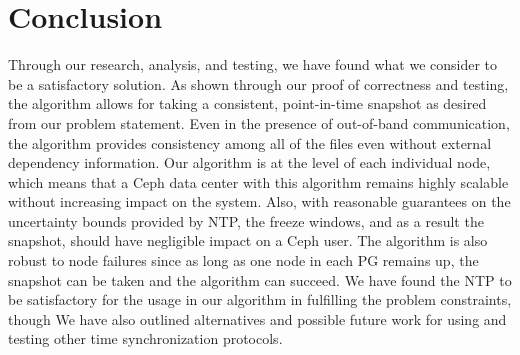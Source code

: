 \chapter{Conclusion}
\label{sec:conclusion}

Through our research, analysis, and testing, we have found what we
consider to be a satisfactory solution. As shown through our proof of
correctness and testing, the algorithm allows for taking a consistent,
point-in-time snapshot as desired from our problem statement. Even in
the presence of out-of-band communication, the algorithm provides
consistency among all of the files even without external dependency
information. Our algorithm is at the level of each individual node,
which means that a Ceph data center with this algorithm remains highly
scalable without increasing impact on the system. Also, with
reasonable guarantees on the uncertainty bounds provided by NTP, the
freeze windows, and as a result the snapshot, should have negligible
impact on a Ceph user. The algorithm is also robust to node failures
since as long as one node in each PG remains up, the snapshot can be
taken and the algorithm can succeed. We have found the NTP to be
satisfactory for the usage in our algorithm in fulfilling the problem
constraints, though We have also outlined alternatives and possible
future work for using and testing other time synchronization
protocols.
